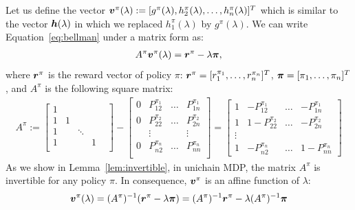 \documentclass[acmsmall,screen,anonymous]{acmart}
\begin{document}
Let us define the vector $\boldsymbol{v}^\pi(\lambda):=[ g^\pi(\lambda), h^\pi_2(\lambda),\dots, h^\pi_n(\lambda)]^T$ which is similar to the vector $\boldsymbol{h}(\lambda)$ in which we replaced $h^\pi_1(\lambda)$ by $g^\pi(\lambda)$. We can write Equation~\eqref{eq:bellman} under a matrix form as:
\begin{align}
    A^{\pi} \boldsymbol{v}^\pi(\lambda)
    = \boldsymbol{r}^{\pi} - \lambda \boldsymbol{\pi}, \label{eq:pre_lin_eq}
\end{align}
where $\boldsymbol{r}^{\pi}$ is the reward vector of policy $\pi$: $\boldsymbol{r}^{\pi}=[r^{\pi_1}_1,\dots,r^{\pi_n}_n]^T$, $\boldsymbol{\pi}=[\pi_1,\dots,\pi_n]^T$, and $A^{\pi}$ is the following square matrix:
\begin{align}
    {A^{\pi} := \left[\begin{array}{cccccc}
        1 & & & &\\
        1 & 1 &  &\\
        1 & & \ddots & \\
        1 & &  &1\\
    \end{array}
\right] {-}
        \left[\begin{array}{ccccc}
                0 & P_{12}^{\pi_1} &\dots & P^{\pi_1}_{1n}\\
                0 & P_{22}^{\pi_2} &\dots & P^{\pi_2}_{2n}\\
                  &\vdots&&\vdots\\
                0 & P_{n2}^{\pi_n} &\dots & P^{\pi_n}_{nn}\\
        \end{array}
        \right]}
        {=} {\left[\begin{array}{ccccc}
                1 & - P_{12}^{\pi_1} & \dots & -P_{1n}^{\pi_1}\\
                1 & 1-P_{22}^{\pi_2} & \dots & -P_{2n}^{\pi_2}\\
                \vdots\\
                1 &  -P_{n2}^{\pi_n} & \dots &1-P_{nn}^{\pi_n}
        \end{array}\right]} \label{eq:def_A}
\end{align}
As we show in Lemma~\ref{lem:invertible}, in unichain MDP, the matrix $A^{\pi}$ is invertible for any policy $\pi$. In consequence, $\boldsymbol{v}^{\pi}$ is an affine function of $\lambda$:
\begin{align}
    \label{eq:h is linear}
    \boldsymbol{v}^{\pi}(\lambda) = (A^{\pi})^{-1}(\boldsymbol{r}^{\pi} - \lambda \boldsymbol{\pi}) =(A^{\pi})^{-1}\boldsymbol{r}^\pi - \lambda (A^{\pi})^{-1}\boldsymbol{\pi}
\end{align}
\end{document}
